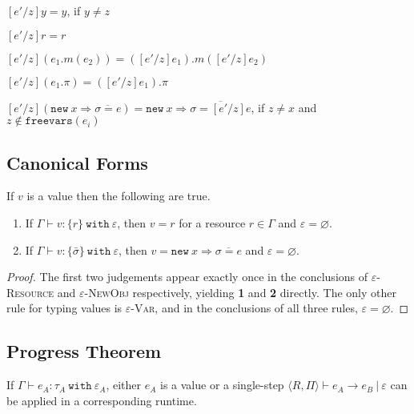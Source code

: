 \documentclass[a4paper,UKenglish]{lipics-v2016}
\newcommand{\kw}[1]{\mathtt{ #1 }~}
\newcommand{\kwa}[1]{\mathtt{ #1 }}
\newcommand{\newbasic}[0]{
	\kwa{new}~x \Rightarrow \overline{\sigma = e}
}
\newcommand{\rctx}[0]{ \langle R, \Pi \rangle }
\begin{document}
$[e'/z]y = y$, if $y \neq z$

$[e'/z]r = r$

$[e'/z](e_1.m(e_2)) = ([e'/z]e_1).m([e'/z]e_2)$

$[e'/z](e_1.\pi) = ([e'/z]e_1).\pi$

$[e'/z](\newbasic) = \kwa{new}~x\Rightarrow \overline{\sigma = [e'/z]e}$, if $z \neq x$ and $z \notin \kwa{freevars}(e_i)$

\subsection{Canonical Forms}

\begin{lemma}
If $v$ is a value then the following are true.
\begin{enumerate} 
	\item If $\Gamma \vdash v:\{ r \}~\kw{with} \varepsilon$, then $v = r$ for a resource $r \in \Gamma$ and $\varepsilon = \varnothing$.
	\item If $\Gamma \vdash v: \{ \bar \sigma \}~\kw{with} \varepsilon$, then $v = \newbasic$ and $\varepsilon = \varnothing$.
\end{enumerate}
\end{lemma}

\begin{proof}
The first two judgements appear exactly once in the conclusions of \textsc{$\varepsilon$-Resource} and \textsc{$\varepsilon$-NewObj} respectively, yielding \textbf{1} and \textbf{2} directly. The only other rule for typing values is \textsc{$\varepsilon$-Var}, and in the conclusions of all three rules, $\varepsilon = \varnothing$.
\end{proof}

\subsection{Progress Theorem}

\begin{theorem}[Progress]
If $\Gamma \vdash e_A: \tau_A~\kw{with} \varepsilon_A$, either $e_A$ is a value or a single-step $\rctx \vdash e_A \longrightarrow e_B~|~\varepsilon$ can be applied in a corresponding runtime.
\end{theorem}
\end{document}
